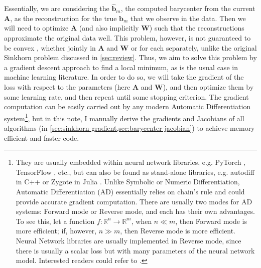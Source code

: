 Essentially, we are considering the $\widehat{\mathbf{b}}_m$,
the computed barycenter from the current $\mathbf{A}$,
as the reconstruction for the true $\mathbf{b}_m$ that we observe in the data.
Then we will need to optimize $\mathbf{A}$ (and also implicitly $\mathbf{W}$)
such that the reconstructions approximate the original data well.
This problem, however, is not guaranteed to be convex \citep{schmitz2018},
whether jointly in $\mathbf{A}$ and $\mathbf{W}$ or for each separately,
unlike the original Sinkhorn problem discussed in \cref{sec:review}.
Thus, we aim to solve this problem by a gradient descent approach to find a local minimum,
as is the usual case in machine learning literature.
In order to do so, we will take the gradient of the loss with respect to the parameters
(here $\mathbf{A}$ and $\mathbf{W}$), and then optimize them by some learning rate,
and then repeat until some stopping criterion.
The gradient computation can be easily carried out by any modern Automatic Differentiation system\footnote{
  They are usually embedded within neural network libraries, e.g. PyTorch \citep{paszke2017}, TensorFlow \citep{abadi2016}, etc.,
  but can also be found as stand-alone libraries, e.g. autodiff in C++ \citep{leal2018} or Zygote in Julia \citep{innes2019}.
  Unlike Symbolic or Numeric Differentiation, Automatic Differentiation (AD) essentially relies on chain's rule
  and could provide accurate gradient computation.
  There are usually two modes for AD systems: Forward mode or Reverse mode, and each has their own advantages.
  To see this,
  let a function $f: \mathbb{R}^n \to \mathbb{R}^m$, when $n \ll m$, then Forward mode is more efficient;
  if, however, $n \gg m$, then Reverse mode is more efficient.
  Neural Network libraries are usually implemented in Reverse mode,
  since there is usually a scalar loss but with many parameters of the neural network model.
  Interested readers could refer to \citet[Chapter 8]{nocedal2006}.
},
but in this note, I manually derive the gradients and Jacobians of all algorithms
(in \cref{sec:sinkhorn-gradient,sec:barycenter-jacobian}) to achieve memory efficient and faster code.

